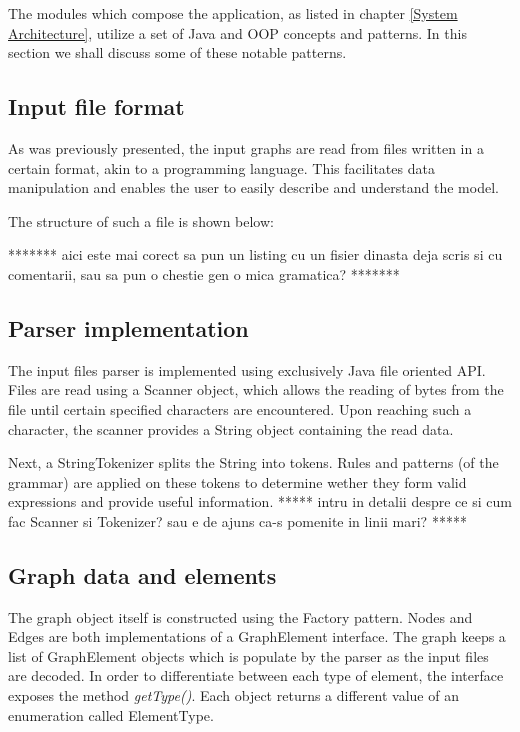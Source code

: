 The modules which compose the application, as listed in chapter \ref{System Architecture}, utilize a set of Java 
and OOP concepts and patterns. In this section we shall discuss some of these notable patterns.

\subsection{Input file format}

As was previously presented, the input graphs are read from files written in a certain format, akin to a programming 
language. This facilitates data manipulation and enables the user to easily describe and understand the model. 

The structure of such a file is shown below:

******* aici este mai corect sa pun un listing cu un fisier dinasta deja scris si cu comentarii, sau sa pun o chestie 
gen o mica gramatica? *******

\subsection{Parser implementation}

The input files parser is implemented using exclusively Java file oriented API. Files are read using a Scanner object, 
which allows the reading of bytes from the file until certain specified characters are encountered. Upon reaching 
such a character, the scanner provides a String object containing the read data. 

Next, a StringTokenizer splits the String into tokens. Rules and patterns (of the grammar) are applied on these tokens 
to determine wether they form valid expressions and provide useful information. ***** intru in detalii despre ce si cum 
fac Scanner si Tokenizer? sau e de ajuns ca-s pomenite in linii mari? *****

\subsection{Graph data and elements}

The graph object itself is constructed using the Factory pattern. Nodes and Edges are both implementations of a 
GraphElement interface. The graph keeps a list of GraphElement objects which is populate by the parser as the input 
files are decoded. In order to differentiate between each type of element, the interface exposes the method 
\emph{getType()}. Each object returns a different value of an enumeration called ElementType. 

